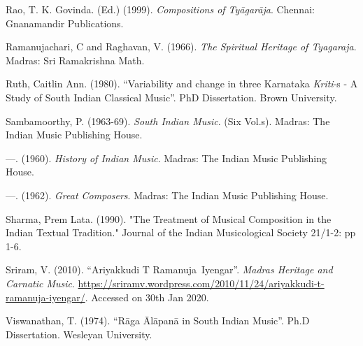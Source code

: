 \begin{thebibliography}{99}
  Rao, T. K. Govinda. (Ed.) (1999). \textit{Compositions of Tyāgarāja}. Chennai: Gnanamandir Publications.

  Ramanujachari, C and Raghavan, V. (1966). \textit{The Spiritual Heritage of Tyagaraja}. Madras: Sri Ramakrishna Math.

  Ruth, Caitlin Ann. (1980). “Variability and change in three Karnataka \textit{Kriti}-s - A Study of South Indian Classical Music”. PhD Dissertation. Brown University.

  Sambamoorthy, P. (1963-69). \textit{South Indian Music}. (Six Vol.s). Madras: The Indian Music Publishing House.

  —. (1960). \textit{History of Indian Music}. Madras: The Indian Music Publishing House.

  —. (1962). \textit{Great Composers}. Madras: The Indian Music Publishing House.

  Sharma, Prem Lata. (1990). "The Treatment of Musical Composition in the Indian Textual Tradition." Journal of the Indian Musicological Society 21/1-2: pp 1-6.

  Sriram, V. (2010). “Ariyakkudi T Ramanuja Iyengar”. \textit{Madras Heritage and Carnatic Music}. \url{https://sriramv.wordpress.com/2010/11/24/ariyakkudi-t-ramanuja-iyengar/}. Accessed on 30th Jan 2020.

  Viswanathan, T. (1974). “Rāga Ālāpanā in South Indian Music”. Ph.D Dissertation. Wesleyan University.

 \end{thebibliography}

